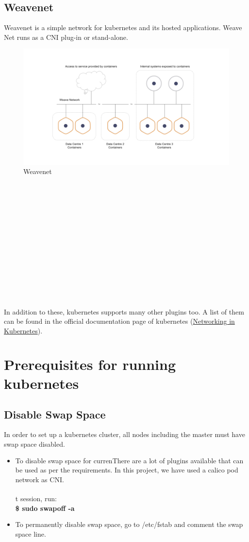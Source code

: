 \documentclass[12pt]{report}
\begin{document}
\subsection{Weavenet}
Weavenet is a simple network for kubernetes and its hosted applications. Weave Net runs as a CNI plug-in or stand-alone.
\begin{figure}[h!]
	\begin{center}
		\includegraphics[totalheight=0.33\textheight]{weavenet}
		\caption{Weavenet \cite{Weavenet}}
	\end{center}
\end{figure}
\\\\\\\\\\\\\\\\\\\\\\\\
\\In addition to these, kubernetes supports many other plugins too. A list of them can be found in the official documentation page of kubernetes (\href{https://kubernetes.io/docs/concepts/cluster-administration/networking/}{Networking in Kubernetes})\cite{Knet}.
\section{Prerequisites for running kubernetes \cite{Prereq}}
\subsection{Disable Swap Space}
In order to set up a kubernetes cluster, all nodes including the master must have swap space disabled.
\begin{itemize}
	\item To disable swap space for currenThere are a lot of plugins available that can be used as per the requirements. In this project, we have used a calico pod network as CNI.\\\\t session, run: \\
	\textbf{\$ sudo swapoff -a}
	\item To permanently disable swap space, go to /etc/fstab and comment the swap space line.
\end{itemize}
\end{document}

